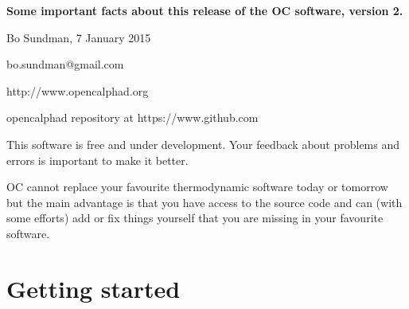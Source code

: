 \documentclass[12pt]{article}
\begin{document}
\begin{center}
{\Large \bf Some important facts about this release of the
  OC software, version 2.}

Bo Sundman,  7 January 2015

bo.sundman@gmail.com

http://www.opencalphad.org

opencalphad repository at https://www.github.com

\end{center}

This software is free and under development.  Your feedback about
problems and errors is important to make it better.

OC cannot replace your favourite thermodynamic software today or
tomorrow but the main advantage is that you have access to the source
code and can (with some efforts) add or fix things yourself that you
are missing in your favourite software.

\section{Getting started}
\end{document}
